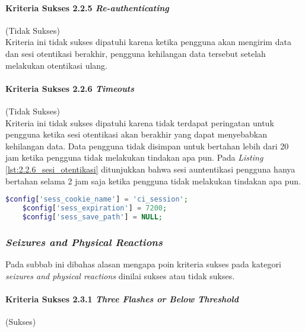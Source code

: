 \paragraph{Kriteria Sukses 2.2.5 \textit{Re-authenticating}}
\label{par:kepatuhan_bluetape_kriteria_sukses_2.2.5}
(Tidak Sukses)\\

Kriteria ini tidak sukses dipatuhi karena ketika pengguna akan mengirim data dan sesi otentikasi berakhir, pengguna kehilangan data tersebut setelah melakukan otentikasi ulang.

\paragraph{Kriteria Sukses 2.2.6 \textit{Timeouts}}
\label{par:kepatuhan_bluetape_kriteria_sukses_2.2.6}
(Tidak Sukses)\\

Kriteria ini tidak sukses dipatuhi karena tidak terdapat peringatan untuk pengguna ketika sesi otentikasi akan berakhir yang dapat menyebabkan kehilangan data. Data pengguna tidak disimpan untuk bertahan lebih dari 20 jam ketika pengguna tidak melakukan tindakan apa pun. Pada \textit{Listing} \ref{lst:2.2.6_sesi_otentikasi} ditunjukkan bahwa sesi auntentikasi pengguna hanya bertahan selama 2 jam saja ketika pengguna tidak melakukan tindakan apa pun.

\begin{lstlisting}[frame=single, label={lst:2.2.6_sesi_otentikasi}, language=PHP, caption=Pelanggaran Kriteria Sukses 2.2.6 pada Bagian Sesi Otentikasi]
    $config['sess_cookie_name'] = 'ci_session';
    $config['sess_expiration'] = 7200;
    $config['sess_save_path'] = NULL;
\end{lstlisting}

\subsubsection{\textit{Seizures and Physical Reactions}}
\label{subsubsec:kepatuhan_bluetape_seizures_and_physical_reactions}
Pada subbab ini dibahas alasan mengapa poin kriteria sukses pada kategori \textit{seizures and physical reactions} dinilai sukses atau tidak sukses.

\paragraph{Kriteria Sukses 2.3.1 \textit{Three Flashes or Below Threshold}}
\label{par:kepatuhan_bluetape_kriteria_sukses_2.3.1}
(Sukses)\\

